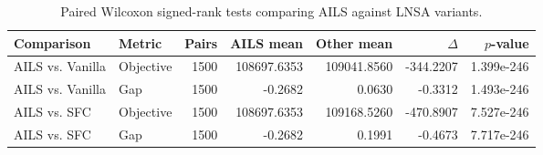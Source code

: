\begin{table}[!ht]
\centering
\footnotesize
\caption{Paired Wilcoxon signed-rank tests comparing AILS against LNSA variants.}
\label{tab:wilcoxon_ails}
\begin{tabular}{llrrrrr}
\hline
\textbf{Comparison} &
\textbf{Metric} &
\textbf{Pairs} &
\textbf{AILS mean} &
\textbf{Other mean} &
\textbf{$\Delta$} &
\textbf{$p$-value} \\
\hline
AILS vs. Vanilla & Objective & 1500 & 108697.6353 & 109041.8560 & -344.2207 & 1.399e-246 \\
AILS vs. Vanilla & Gap & 1500 & -0.2682 & 0.0630 & -0.3312 & 1.493e-246 \\
AILS vs. SFC & Objective & 1500 & 108697.6353 & 109168.5260 & -470.8907 & 7.527e-246 \\
AILS vs. SFC & Gap & 1500 & -0.2682 & 0.1991 & -0.4673 & 7.717e-246 \\
\hline
\end{tabular}
\end{table}
